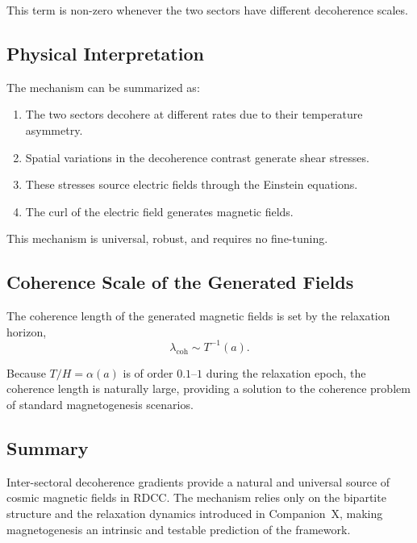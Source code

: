 \documentclass[11pt,a4paper]{article}
\begin{document}
This term is non-zero whenever the two sectors have different decoherence scales.

\subsection{Physical Interpretation}

The mechanism can be summarized as:
\begin{enumerate}
\item The two sectors decohere at different rates due to their temperature asymmetry.
\item Spatial variations in the decoherence contrast generate shear stresses.
\item These stresses source electric fields through the Einstein equations.
\item The curl of the electric field generates magnetic fields.
\end{enumerate}

This mechanism is universal, robust, and requires no fine-tuning.

\subsection{Coherence Scale of the Generated Fields}

The coherence length of the generated magnetic fields is set by the relaxation horizon,
\begin{equation}
\lambda_{\mathrm{coh}}
\sim
T^{-1}(a).
\end{equation}

Because $T/H = \alpha(a)$ is of order $0.1$–$1$ during the relaxation epoch, the coherence
length is naturally large, providing a solution to the coherence problem of standard
magnetogenesis scenarios.

\subsection{Summary}

Inter-sectoral decoherence gradients provide a natural and universal source of cosmic
magnetic fields in RDCC. The mechanism relies only on the bipartite structure and the
relaxation dynamics introduced in Companion~X, making magnetogenesis an intrinsic and
testable prediction of the framework.
\end{document}
